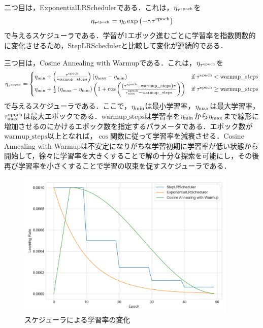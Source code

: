 二つ目は，ExponentialLRSchedulerである．これは，$\eta_{\tau^{\text{epoch}}}$を
\begin{equation}
    \eta_{\tau^{\text{epoch}}} = \eta_{0} \exp \left( -\gamma \tau^{\text{epoch}} \right)
\end{equation}
で与えるスケジューラである．学習が1エポック進むごとに学習率を指数関数的に変化させるため，StepLRSchedulerと比較して変化が連続的である．

三つ目は，Cosine Annealing with Warmupである．これは，$\eta_{\tau^{\text{epoch}}}$を
\begin{equation}
    \eta_{\tau^{\text{epoch}}} =
    \begin{cases}
        \eta_{\text{min}} + \left( \frac{\tau^{\text{epoch}}}{\text{warmup\_steps}} \right) \left(\eta_{\text{max}} - \eta_{\text{min}}\right)                                                                                  & \text{if $\tau^{\text{epoch}} < \text{warmup\_steps}$}   \\
        \eta_{\text{min}} + \frac{1}{2} \left(\eta_{\text{max}} - \eta_{\text{min}}\right) \left( 1 + \cos \left( \frac{\left(\tau^{\text{epoch}} - \text{warmup\_steps}\right)\pi}{\tau^{\text{epoch}}_{\text{max}} - \text{warmup\_steps}} \right) \right) & \text{if $\tau^{\text{epoch}} \ge \text{warmup\_steps}$}
    \end{cases}
\end{equation}
で与えるスケジューラである．ここで，$\eta_{\text{min}}$は最小学習率，$\eta_{\text{max}}$は最大学習率，$\tau^{\text{epoch}}_{\text{max}}$は最大エポックである．$\text{warmup\_steps}$は学習率を$\eta_{\text{min}}$から$\eta_{\text{max}}$まで線形に増加させるのにかけるエポック数を指定するパラメータである．エポック数が$\text{warmup\_steps}$以上となれば，$\cos$関数に従って学習率を減衰させる．Cosine Annealing with Warmupは不安定になりがちな学習初期に学習率が低い状態から開始して，徐々に学習率を大きくすることで解の十分な探索を可能にし，その後再び学習率を小さくすることで学習の収束を促すスケジューラである．

\begin{figure}[bt]
    \centering
    \includegraphics[height=70mm]{./figure/sec3/lr_scheduler.png}
    \caption{スケジューラによる学習率の変化}
    \label{sec3:fig:lr_scheduler}
\end{figure}

